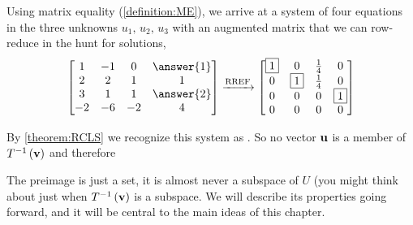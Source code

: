 \documentclass{ximera}
\begin{document}
\begin{example}
Using matrix equality (\ref{definition:ME}), we arrive at a system of four equations in the three unknowns $u_1,\,u_2,\,u_3$ with an augmented matrix that we can row-reduce in the hunt for solutions,
\[
\begin{bmatrix}
1 & -1 & 0 & \answer{1}\\
2 & 2 & 1 & 1\\
3 & 1 & 1 & \answer{2}\\
-2 & -6 & -2 & 4
\end{bmatrix}
\rref
\begin{bmatrix}
\leading{1} & 0 & \frac{1}{4} &  0\\
0 & \leading{1} & \frac{1}{4} &  0\\
0 & 0 & 0 &  \leading{1}\\
0 & 0 & 0 &  0
\end{bmatrix}
\]

By \ref{theorem:RCLS} we recognize this system as .  So no vector $\mathbf{u}$ is a member of $T^{-1}\left(\mathbf{v}\right)$ and therefore
\begin{multipleChoice}
\end{multipleChoice}

\end{example}

The preimage is just a set, it is almost never a subspace of $U$ (you might think about just when $T^{-1}\left(\mathbf{v}\right)$ is a subspace.  We will describe its properties going forward, and it will be central to the main ideas of this chapter.
\end{document}
